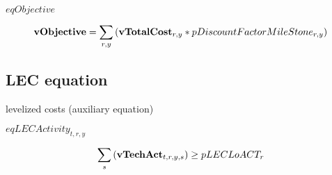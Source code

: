 \documentclass{article}
\begin{document}
$eqObjective$





\begin{dmath} 
{\bf vObjective}  =  \sum_{r,y}{\left({\bf vTotalCost}_{r,y}*pDiscountFactorMileStone_{r,y}\right)}
\end{dmath} 
\subsection*{LEC equation}
levelized costs (auxiliary equation)







$eqLECActivity_{t,r,y}$





\begin{dmath} 
\sum_{s}{\left({\bf vTechAct}_{t,r,y,s}\right)}  \ge  pLECLoACT_{r}
\end{dmath} 
\end{document}
